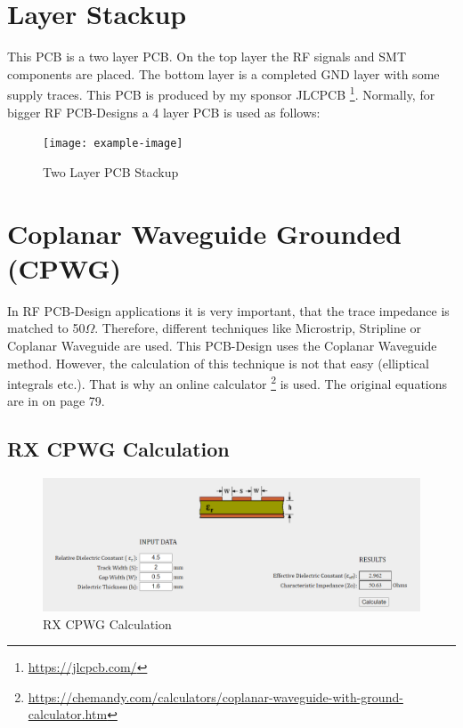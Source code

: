 \section{Layer Stackup}
This \acs{PCB} is a two layer PCB. On the top layer the \acs{RF} signals and SMT components are placed. 
The bottom layer is a completed GND layer with some supply traces.
This PCB is produced by my sponsor JLCPCB \footnote{\url{https://jlcpcb.com/}}.
Normally, for bigger RF PCB-Designs a 4 layer PCB is used as follows: 

\begin{figure}[ht!]
	\centering
	\texttt{[image: example-image]}
	\caption{Two Layer PCB Stackup}
	\label{fig:PCB Layer Stackup}
\end{figure}
\newpage

\section{Coplanar Waveguide Grounded (CPWG)}
In RF PCB-Design applications it is very important, that the trace impedance is matched to 50$\Omega$.
Therefore, different techniques like Microstrip, Stripline or Coplanar Waveguide are used.
This PCB-Design uses the Coplanar Waveguide method. However, the calculation of this technique is not that easy (elliptical integrals etc.). That is why an online calculator \footnote{\url{https://chemandy.com/calculators/coplanar-waveguide-with-ground-calculator.htm}}  \cite{CPWGCalculator.2021} is used.
The original equations are in \cite{transmissionLineDesign} on page 79.

\subsection{RX CPWG Calculation}
	\begin{figure}[ht!]
		\centering
		\includegraphics[width = 15cm]{./3_pcb/fig/CPWG_RX}
		\caption{RX CPWG Calculation}
		\label{fig:RX_CPWG}
	\end{figure}

